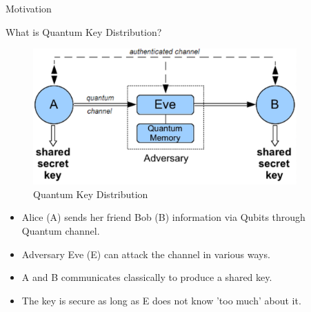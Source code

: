 \documentclass[final]{beamer}
\newlength{\sepwid}
\newlength{\onecolwid}
\newlength{\twocolwid}
\begin{document}
\begin{frame}[t]
\begin{columns}[t]
\begin{column}{\onecolwid}
\begin{block}{Motivation}
\end{block}


\begin{block}{What is Quantum Key Distribution?}
	
	\begin{figure}
		\includegraphics[width=\linewidth]{qkd.png}
		\caption{Quantum Key Distribution}
	\end{figure}
\begin{itemize}
\item Alice (A) sends her friend Bob (B) information via Qubits through Quantum channel.
\item Adversary Eve (E) can attack the channel in various ways.
\item A and B communicates classically to produce a shared key.
\item The key is secure as long as E does not know 'too much' about it.
\end{itemize}	
	
\end{block}


\end{column} %


\begin{column}{\sepwid}\end{column} %

\begin{column}{\twocolwid} %

\begin{columns}[t,totalwidth=\twocolwid] %

\begin{column}{\onecolwid}\vspace{-.6in} %


\end{column}
\end{columns}
\end{column}
\end{columns}
\end{frame}
\end{document}
